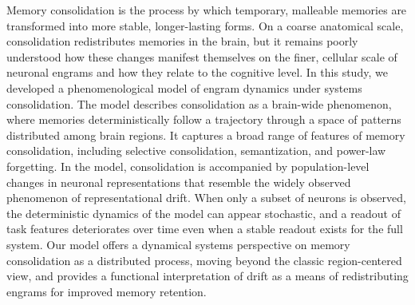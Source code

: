
Memory consolidation is the process by which temporary, malleable memories are transformed into more stable, longer-lasting forms. On a coarse anatomical scale, consolidation redistributes memories in the brain, but it remains poorly understood how these changes manifest themselves on the finer, cellular scale of neuronal engrams and how they relate to the cognitive level. 
In this study, we developed a phenomenological model of engram dynamics under systems consolidation. %
The model describes consolidation as a brain-wide phenomenon, where memories deterministically follow a trajectory through a space of patterns distributed among brain regions. It captures a broad range of features of memory consolidation, including selective consolidation, semantization, and power-law forgetting. 
In the model, consolidation is accompanied by population-level changes in neuronal representations that resemble the widely observed phenomenon of representational drift. 
When only a subset of neurons is observed, the deterministic dynamics of the model can appear stochastic, and a readout of task features deteriorates over time even when a stable readout exists for the full system. Our model offers a dynamical systems perspective on memory consolidation as a distributed process, moving beyond the classic region-centered view, and provides a functional interpretation of drift as a means of redistributing engrams for improved memory retention.

